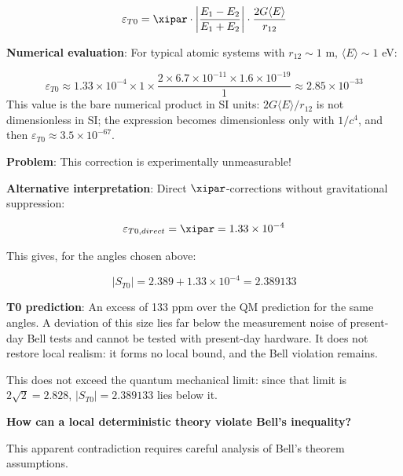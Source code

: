 	\begin{equation}
		\varepsilon_{T0} = \xipar \cdot \left|\frac{E_1 - E_2}{E_1 + E_2}\right| \cdot \frac{2G\langle E \rangle}{r_{12}}
	\end{equation}
	
	\textbf{Numerical evaluation}: For typical atomic systems with $r_{12} \sim 1$ m, $\langle E \rangle \sim 1$ eV:
	
	\begin{equation}
		\varepsilon_{T0} \approx 1.33 \times 10^{-4} \times 1 \times \frac{2 \times 6.7 \times 10^{-11} \times 1.6 \times 10^{-19}}{1} \approx 2.85 \times 10^{-33}
	\end{equation}
	This value is the bare numerical product in SI units: $2G\langle E\rangle/r_{12}$ is not dimensionless in SI; the expression becomes dimensionless only with $1/c^4$, and then $\varepsilon_{T0} \approx 3.5\times10^{-67}$.
	
	\textbf{Problem}: This correction is experimentally unmeasurable!
	
	\textbf{Alternative interpretation}: Direct $\xipar$-corrections without gravitational suppression:
	
	\begin{equation}
		\varepsilon_{T0,direct} = \xipar = 1.33 \times 10^{-4}
	\end{equation}
	
	This gives, for the angles chosen above:
	
	\begin{equation}
		|S_{T0}| = 2.389 + 1.33 \times 10^{-4} = 2.389133
	\end{equation}
	
	\textbf{T0 prediction}: An excess of 133 ppm over the QM prediction for the same angles. A deviation of this size lies far below the measurement noise of present-day Bell tests and cannot be tested with present-day hardware. It does not restore local realism: it forms no local bound, and the Bell violation remains.
	
	This does not exceed the quantum mechanical limit: since that limit is $2\sqrt2 = 2.828$, $|S_{T0}| = 2.389133$ lies below it.
	
	\begin{tcolorbox}[colback=yellow!5!white,colframe=orange!75!black,title=Critical Question]
		\textbf{How can a local deterministic theory violate Bell's inequality?}
		
		This apparent contradiction requires careful analysis of Bell's theorem assumptions.
	\end{tcolorbox}
	
